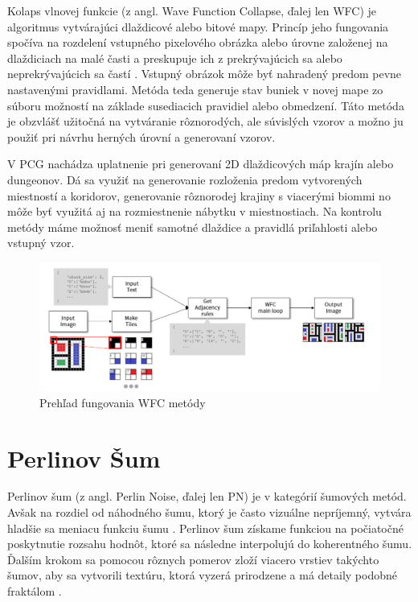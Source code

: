 Kolaps vlnovej funkcie (z angl. Wave Function Collapse, ďalej len WFC) je algoritmus vytvárajúci dlaždicové alebo bitové mapy. Princíp jeho fungovania spočíva na rozdelení vstupného pixelového obrázka alebo úrovne založenej na dlaždiciach na malé časti a preskupuje ich z prekrývajúcich sa alebo neprekrývajúcich sa častí \cite{kim2019wfc}. Vstupný obrázok môže byť nahradený predom pevne nastavenými pravidlami. Metóda teda generuje stav buniek v novej mape zo súboru možností na základe susediacich pravidiel alebo obmedzení. Táto metóda je obzvlášť užitočná na vytváranie rôznorodých, ale súvislých vzorov a možno ju použiť pri návrhu herných úrovní a generovaní vzorov.

V PCG nachádza uplatnenie pri generovaní 2D dlaždicových máp krajín alebo dungeonov. Dá sa využiť na generovanie rozloženia predom vytvorených miestností a koridorov, generovanie rôznorodej krajiny s viacerými biommi no môže byť využitá aj na rozmiestnenie nábytku v miestnostiach. Na kontrolu metódy máme možnosť meniť samotné dlaždice a pravidlá priľahlosti alebo vstupný vzor.

\begin{figure}[H]
    \centering
    \includegraphics[width=1\linewidth]{obrazky-figures/wfc-example.png}
    \caption{Prehľad fungovania WFC metódy \cite{kim2019wfc}}
    \label{fig:enter-label}
\end{figure}

\section{Perlinov Šum}

Perlinov šum (z angl. Perlin Noise, ďalej len PN) je v kategórií šumových metód. Avšak na rozdiel od náhodného šumu, ktorý je často vizuálne nepríjemný, vytvára hladšie sa meniacu funkciu šumu \cite{kelly2006perlin}. Perlinov šum získame funkciou na počiatočné poskytnutie rozsahu hodnôt, ktoré sa následne interpolujú do koherentného šumu. Ďalším krokom sa pomocou rôznych pomerov zloží viacero vrstiev takýchto šumov, aby sa vytvorili textúru, ktorá vyzerá prirodzene a má detaily podobné fraktálom \cite{archer2011procedurally}.

